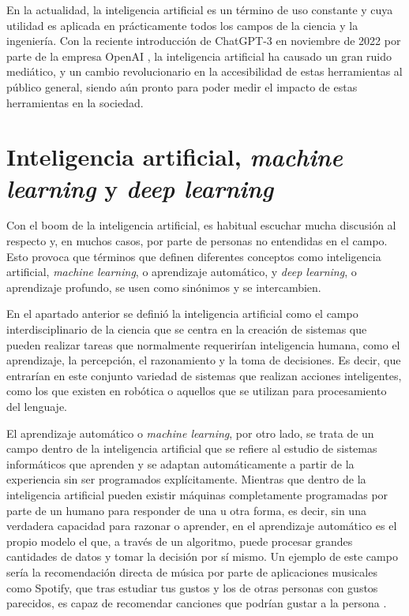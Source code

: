 \documentclass{report}
\begin{document}
En la actualidad, la inteligencia artificial es un término de uso constante y cuya utilidad es aplicada en prácticamente todos los campos de la ciencia y la ingeniería. Con la reciente introducción de ChatGPT-3 en noviembre de 2022 por parte de la empresa OpenAI \cite{ChatGPT}, la inteligencia artificial ha causado un gran ruido mediático, y un cambio revolucionario en la accesibilidad de estas herramientas al público general, siendo aún pronto para poder medir el impacto de estas herramientas en la sociedad.




\section{Inteligencia artificial, \textit{machine learning} y \textit{deep learning} }


Con el boom de la inteligencia artificial, es habitual escuchar mucha discusión al respecto y, en muchos casos, por parte de personas no entendidas en el campo. Esto provoca que términos que definen diferentes conceptos como inteligencia artificial, \textit{machine learning}, o aprendizaje automático, y \textit{deep learning}, o aprendizaje profundo, se usen como sinónimos y se intercambien. 


En el apartado anterior se definió la inteligencia artificial como el campo interdisciplinario de la ciencia que se centra en la creación de sistemas que pueden realizar tareas que normalmente requerirían inteligencia humana, como el aprendizaje, la percepción, el razonamiento y la toma de decisiones. Es decir, que entrarían en este conjunto variedad de sistemas que realizan acciones inteligentes, como los que existen en robótica o aquellos que se utilizan para procesamiento del lenguaje.


El aprendizaje automático o \textit{machine learning}, por otro lado, se trata de un campo dentro de la inteligencia artificial que se refiere al estudio de sistemas informáticos que aprenden y se adaptan automáticamente a partir de la experiencia sin ser programados explícitamente. Mientras que dentro de la inteligencia artificial pueden existir máquinas completamente programadas por parte de un humano para responder de una u otra forma, es decir, sin una verdadera capacidad para razonar o aprender, en el aprendizaje automático es el propio modelo el que, a través de un algoritmo, puede procesar grandes cantidades de datos y tomar la decisión por sí mismo. Un ejemplo de este campo sería la recomendación directa de música por parte de aplicaciones musicales como Spotify, que tras estudiar tus gustos y los de otras personas con gustos parecidos, es capaz de recomendar canciones que podrían gustar a la persona \cite{Coursera}.
\end{document}
